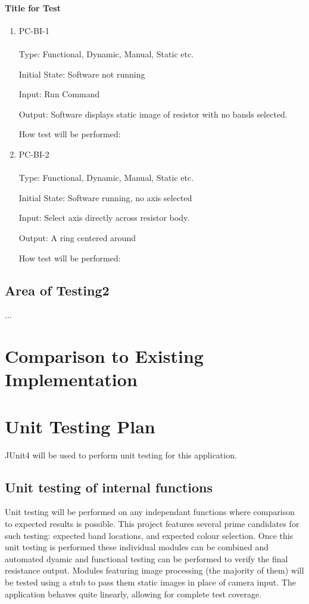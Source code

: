\documentclass[12pt, titlepage]{article}
\begin{document}
\paragraph{Title for Test}
\begin{enumerate}
\item{PC-BI-1\\}
\\
Type: Functional, Dynamic, Manual, Static etc.
					
Initial State: Software not running
					
Input: Run Command
					
Output: Software displays static image of resistor with no bands selected.
					
How test will be performed: 
					
\item{PC-BI-2\\}
\\
Type: Functional, Dynamic, Manual, Static etc.
					
Initial State: Software running, no axis selected
					
Input: Select axis directly across resistor body.
					
Output:  A ring centered around
					
How test will be performed: 
\end{enumerate}
\subsection{Area of Testing2}
...
	
\section{Comparison to Existing Implementation}	
				
\section{Unit Testing Plan}	
\par JUnit4 will be used to perform unit testing for this application.	
\subsection{Unit testing of internal functions}
\par Unit testing will be performed on any independant functions where comparison to expected results is possible. This project features several prime candidates for such testing: expected band locations, and expected colour selection. Once this unit testing is performed these individual modules can be combined and automated dyamic and functional testing can be performed to verify the final resistance output. Modules featuring image processing (the majority of them) will be tested using a stub to pass them static images in place of camera input. The application behaves quite linearly, allowing for complete test coverage.
\end{document}
